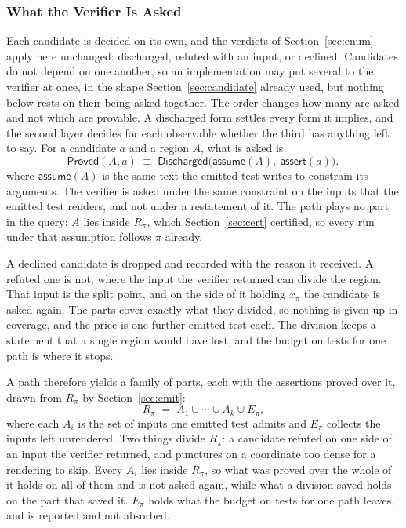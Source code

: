 \documentclass[manuscript,anonymous]{acmart}
\begin{document}
\subsubsection{What the Verifier Is Asked}
Each candidate is decided on its own, and the verdicts of Section~\ref{sec:enum}
apply here unchanged: discharged, refuted with an input, or declined. Candidates
do not depend on one another, so an implementation may put several to the
verifier at once, in the shape Section~\ref{sec:candidate} already used, but
nothing below rests on their being asked together. The order changes how many
are asked and not which are provable. A discharged form settles every form it
implies, and the second layer decides for each observable whether the third has
anything left to say. For a candidate $a$ and a
region $A$, what is asked is
\begin{equation}
\mathsf{Proved}(A, a) \;\equiv\;
\mathsf{Discharged}\bigl(\mathsf{assume}(A),\ \mathsf{assert}(a)\bigr),
\label{eq:oracle-query}
\end{equation}
where $\mathsf{assume}(A)$ is the same text the emitted test writes to
constrain its arguments. The verifier is asked under the same constraint on the
inputs that the emitted test renders, and not under a restatement of it. The
path plays no part in the query: $A$ lies inside $R_\pi$, which
Section~\ref{sec:cert} certified, so every run under that assumption follows
$\pi$ already.

A declined candidate is dropped and recorded with the reason it received. A
refuted one is not, where the input the verifier returned can divide the region.
That input is the split point, and on the side of it holding $x_\pi$ the
candidate is asked again. The parts cover exactly what they divided, so nothing
is given up in coverage, and the price is one further emitted test each.
The division keeps a statement that a single region would have lost, and the
budget on tests for one path is where it stops.

A path therefore yields a family of parts, each with the assertions proved over
it, drawn from $R_\pi$ by Section~\ref{sec:emit}:
\begin{equation}
R_\pi \;=\; A_1 \cup \cdots \cup A_k \cup E_\pi ,
\label{eq:parts}
\end{equation}
where each $A_i$ is the set of inputs one emitted test admits and $E_\pi$
collects the inputs left unrendered. Two things divide $R_\pi$: a candidate
refuted on one side of an input the verifier returned, and punctures on a
coordinate too dense for a rendering to skip. Every $A_i$ lies inside $R_\pi$,
so what was proved over the whole of it holds on all of them and is not asked
again, while what a division saved holds on the part that saved it. $E_\pi$
holds what the budget on tests for one path leaves, and is reported and not
absorbed.
\end{document}

